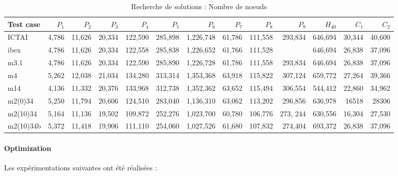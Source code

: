 \documentclass{article}
\begin{document}
\begin{table*}[htb]
\caption{Recherche de solutions : Nombre de noeuds}
\begin{center}
{\tiny
\begin{tabular}{|l||r|r|r|r|r|r|r|r|r|r||r|r|}
\hline
Test case & $P_1$ & $P_2$ & $P_3$ & $P_4$ & $P_5$ & $P_6$ & $P_7$ & $P_8$ & $P_9$ & $H_{40}$ & $C_1$ & $C_2$\\
\hline

ICTAI & 4,786  &11,626& 20,334  &122,590  &285,898 & 1,226,748 &   61,786  &  111,558  & 293,834 &646,694&30,344 &  40,600\\
ibex & 4,786 & 11,626 &20,334 & 122,558 &285,838 & 1,226,652 & 61,766 & 111,528 & & 646,694 &  26,838 &37,096 \\
m3.1 & 4,786  &11,626& 20,334  &122,590 &285,890 &  1,226,728 & 61,786 &111,558&293,834 &646,694 & 26,838 & 37,096\\
m4 & 5,262& 12,038 & 21,034 & 134,280 & 313,314 &1,353,368 & 63,918 & 115,822 &307,124 & 659,772 &27,264 & 39,366 \\
m14&4,136 & 11,332 &20,376 & 133,968 & 312,738 & 1,352,362 & 63,652 & 115,494 & 306,554& 544,412 & 22,860 & 34,962  \\
m2(0)34 & 5,250 & 11,794 &20,606  &124,510   & 283,040  &1,136,310   &63,062 & 113,202 &296,856 &636,978  & 16518  & 28306 \\
m2(10)34 & 5,164 & 11,136 & 19,502 & 109,872 & 252,276 & 1,023,700 &60,780 & 106,776 &273, 244 &630,556 & 16,304 & 27,530 \\
m2(10)34b &5,372 & 11,418 & 19,906 &111,110 &254,060 & 1,027,526 & 61,680 &107,832 &  274,404 & 693,372 & 26,838 &  37,096 \\
\hline
\end{tabular}
}
\end{center}
\label{noderesults}
\end{table*}

\paragraph{Optimization}

Les exp\'erimentations suivantes ont \'et\'e r\'ealis\'ees :
\end{document}
